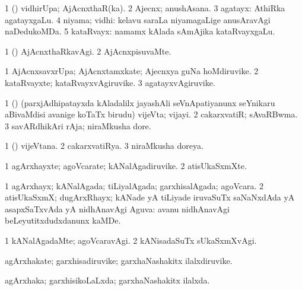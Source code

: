 \bentry
{}
\gl{\nA}
\bmng
\bnum
\num{1} (\vAyx) vidhirUpa; AjAcnxthaR(ka). 
\num{2} Ajecnx; anushAsana. 
\num{3} agatayx:  AthiRka agatayxgaLu. 
\num{4} niyama; vidhi:  kelavu saraLa niyamagaLige anusAravAgi naDedukoMDa. 
\num{5} kataRvayx:  namamx kAlada sAmAjika kataRvayxgaLu. 
\enum
\emng
\eentry

\bentry
{}
\gl{\kirxvi}
\bmng
\bnum
\num{1} (\vAyx) AjAcnxthaRkavAgi. 
\num{2} AjAcnxpisuvaMte. 
\enum
\emng
\eentry

\bentry
{}
\gl{\nA}
\bmng
\bnum
\num{1} AjAcnxsavxrUpa; AjAcnxtamxkate; Ajecnxya guNa hoMdiruvike. 
\num{2} kataRvayxte; kataRvayxvAgiruvike. 
\num{3} agatayxvAgiruvike. 
\enum
\emng
\eentry

\bentry
{}
\gl{\nA}
\bmng
\bnum
\num{1} (\roVca) (parxjAdhipatayxda kAladalilx jayashAli seVnApatiyanunx seYnikaru aBivaMdisi avanige koTaTx birudu) vijeVta; vijayi. 
\num{2} cakarxvatiR; sAvaRBwma. 
\num{3} savARdhikAri rAja; niraMkusha dore. 
\enum
\emng
\eentry

\bentry
{}
\gl{\gu}
\bmng
\bnum
\num{1} (\roVca) vijeVtana. 
\num{2} cakarxvatiRya. 
\num{3} niraMkusha doreya. 
\enum
\emng
\eentry

\bentry
{}
\gl{\nA}
\bmng
\bnum
\num{1} agArxhayxte; agoVcarate; kANalAgadiruvike. 
\num{2} atisUkaSxmXte. 
\enum
\emng
\eentry

\bentry
{}
\gl{\gu}
\bmng
\bnum
\num{1} agArxhayx; kANalAgada; tiLiyalAgada; garxhisalAgada; agoVcara. 
\num{2} atisUkaSxmX; dugArxRhayx; kANade yA tiLiyade iruvaSuTx saNaNxdAda yA asapxSaTxvAda yA nidhAnavAgi Aguva:  avanu nidhAnavAgi beLeyutitxdudxdanunx kaMDe. 
\enum
\emng
\eentry

\bentry
{}
\gl{\kirxvi}
\bmng
\bnum
\num{1} kANalAgadaMte; agoVcaravAgi. 
\num{2} kANisadaSuTx sUkaSxmXvAgi. 
\enum
\emng
\eentry

\bentry
{}
\gl{\nA}
\bmng
agArxhakate; garxhisadiruvike; garxhaNashakitx ilalxdiruvike. 
\emng
\eentry

\bentry
{}
\gl{\gu}
\bmng
agArxhaka; garxhisikoLaLxda; garxhaNashakitx ilalxda. 
\emng
\eentry

